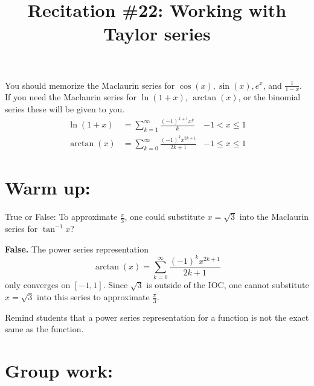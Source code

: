 \documentclass[noinstructornotes]{ximera}
\title{Recitation \#22: Working with Taylor series}
\begin{document}
\begin{abstract}		\end{abstract}
\maketitle

You should memorize the Maclaurin series for $\cos(x), \sin(x), e^x$, and $\frac{1}{1-x}$.  If you need the Maclaurin series for $\ln(1+x)$, $\arctan(x)$, or the binomial series these will be given to you.
\begin{align*}
		\ln(1+x) &= \sum_{k=1}^\infty \frac{(-1)^{k+1} x^k}{k}  &-1 < x \leq 1 \\
		\arctan(x) &=\sum_{k=0}^\infty \frac{(-1)^k x^{2k+1}}{2k+1}   &-1 \leq x \leq 1
\end{align*}

\section{Warm up:}
True or False:  To approximate $\frac{\pi}{3}$, one could substitute $x = \sqrt{3}$ into the Maclaurin series for $\tan^{-1}x$?
	\begin{freeResponse}
	{\bf False.}  The power series representation 
		\[
		\arctan(x) = \sum_{k=0}^\infty \frac{(-1)^k x^{2k+1}}{2k+1} 
		\]
	only converges on $[-1,1]$.  
	Since $\sqrt{3}$ is outside of the IOC, one cannot substitute $x=\sqrt{3}$ into this series to approximate $\frac{\pi}{3}$.  
	\end{freeResponse}	
\begin{instructorNotes}
Remind students that a power series representation for a function is not the exact same as the function.
\end{instructorNotes}







\section{Group work:}
\end{document}
